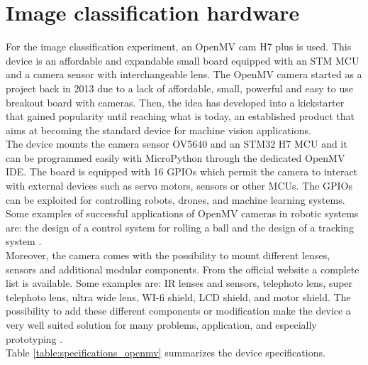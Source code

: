 \documentclass[12pt]{report}
\begin{document}
\section{Image classification hardware}
For the image classification experiment, an OpenMV cam H7 plus \cite{abdelkader2017openmv} \cite{openmv_web_page} is used. This device is an affordable and expandable small board equipped with an STM MCU and a camera sensor with interchangeable lens. The OpenMV camera started as a project \cite{openmv_project} back in 2013 due to a lack of affordable, small, powerful and easy to use breakout board with cameras. Then, the idea has developed into a kickstarter that gained popularity until reaching what is today, an established product that aims at becoming the standard device for machine vision applications. \\
The device mounts the camera sensor OV5640 and an STM32 H7 MCU and it can be programmed easily with MicroPython through the dedicated OpenMV IDE. The board is equipped with 16 GPIOs which permit the camera to interact with external devices such as servo motors, sensors or other MCUs. The GPIOs can be exploited for controlling robots, drones, and machine learning systems. Some examples of successful applications of OpenMV cameras in robotic systems are: the design of a control system for rolling a ball \cite{zhou2019design} and the design of a tracking system \cite{wei2020design}.\\
Moreover, the camera comes with the possibility to mount different lenses, sensors and additional modular components. From the official website a complete list is available. Some examples are: IR lenses and sensors, telephoto lens, super telephoto lens, ultra wide lens, WI-fi shield, LCD shield, and motor shield.
The possibility to add these different components or modification make the device a very well suited solution for many problems, application, and especially prototyping .\\
Table \ref{table:specifications_openmv} summarizes the device specifications.\\
\end{document}
